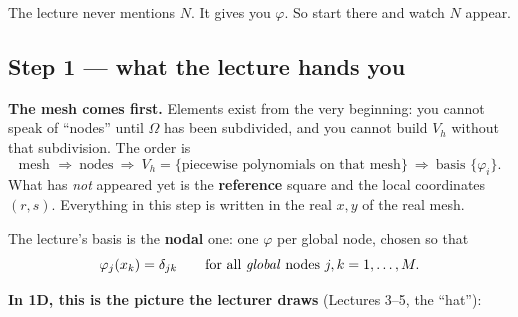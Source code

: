 \documentclass[11pt]{article}
\begin{document}
The lecture never mentions $N$. It gives you $\varphi$. So start there and
watch $N$ appear.

\subsection*{Step 1 --- what the lecture hands you}

\textbf{The mesh comes first.} Elements exist from the very beginning: you
cannot speak of ``nodes'' until $\Omega$ has been subdivided, and you cannot
build $V_{h}$ without that subdivision. The order is
\[
  \text{mesh } \Longrightarrow\ \text{nodes}\ \Longrightarrow\
  V_{h}=\{\text{piecewise polynomials on that mesh}\}\ \Longrightarrow\
  \text{basis } \{\varphi_{i}\} .
\]
What has \emph{not} appeared yet is the \textbf{reference} square and the local
coordinates $(r,s)$. Everything in this step is written in the real $x,y$ of
the real mesh.

\medskip
The lecture's basis is the \textbf{nodal} one: one $\varphi$ per global node,
chosen so that
\begin{equation}\label{eq:globaldelta}
  \varphi_{j}(x_{k})=\delta_{jk}
  \qquad\text{for all \emph{global} nodes } j,k=1,\dots,M .
\end{equation}

\medskip
\textbf{In 1D, this is the picture the lecturer draws} (Lectures 3--5, the
``hat''):

\begin{center}
\end{center}
\end{document}
